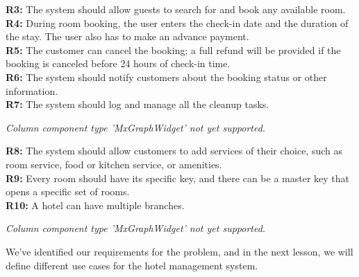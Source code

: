\noindent
\begin{minipage}[t]{0.48\textwidth}\vspace{0pt}
\textbf{R3:} The system should allow guests to search for and book any available room.
\\
\textbf{R4:} During room booking, the user enters the check-in date and the duration of the stay. The user also has to make an advance payment.
\\
\textbf{R5:} The customer can cancel the booking; a full refund will be provided if the booking is canceled before 24 hours of check-in time.
\\
\textbf{R6:} The system should notify customers about the booking status or other information.
\\
\textbf{R7:} The system should log and manage all the cleanup tasks.
\end{minipage}
\hfill
\begin{minipage}[t]{0.48\textwidth}\vspace{0pt}
\textit{Column component type 'MxGraphWidget' not yet supported.}
\end{minipage}

\noindent
\begin{minipage}[t]{0.48\textwidth}\vspace{0pt}
\textbf{R8:} The system should allow customers to add services of their choice, such as room service, food or kitchen service, or amenities.
\\
\textbf{R9:} Every room should have its specific key, and there can be a master key that opens a specific set of rooms.
\\
\textbf{R10:} A hotel can have multiple branches.
\end{minipage}
\hfill
\begin{minipage}[t]{0.48\textwidth}\vspace{0pt}
\textit{Column component type 'MxGraphWidget' not yet supported.}
\end{minipage}

We've identified our requirements for the problem, and in the next lesson, we will define different use cases for the hotel management system.

